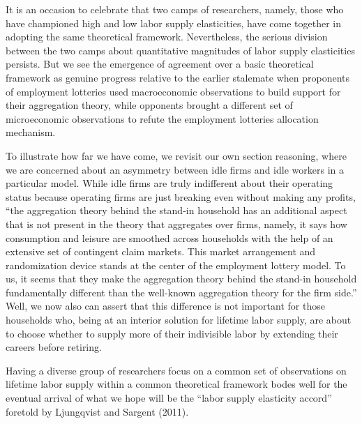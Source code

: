 It is an occasion to celebrate that two  camps of researchers,
namely, those who have championed high and low labor supply elasticities,
have come together in adopting the same theoretical
framework.  Nevertheless, the serious division  between the two camps about quantitative magnitudes of labor supply elasticities
 persists.
But we see the emergence of agreement over a basic theoretical framework as
 genuine progress relative
to the earlier stalemate when proponents of employment
lotteries used macroeconomic observations to build support for
their aggregation theory, while opponents brought a different
set of microeconomic observations to refute the employment lotteries
allocation mechanism.

To illustrate how far we have come, we revisit our own
section  reasoning, where we are concerned about an
asymmetry between idle firms and idle workers in a particular
model. While idle firms are truly indifferent about their operating status because
operating firms are just breaking even without making any profits,
``the aggregation theory behind the stand-in household has an
additional aspect that is not present in the theory that
aggregates over firms, namely, it says how consumption and
leisure are smoothed across households with the help of
an extensive set of contingent claim markets. This market
arrangement and randomization device stands at the center
of the employment lottery model. To us, it seems that they
make the aggregation theory behind the stand-in household
fundamentally different than the well-known aggregation
theory for the firm side.'' Well, we now also can assert   that this
difference is not important for those households who, being  at an interior
solution for lifetime labor supply, are about to choose whether to supply  more of their indivisible labor
by extending their careers  before  retiring.

Having a diverse group of researchers focus on a common set of
observations on lifetime labor supply within a common theoretical
framework bodes well for the eventual arrival of what we hope will be the
``labor supply elasticity accord'' foretold by Ljungqvist and
Sargent (2011).







